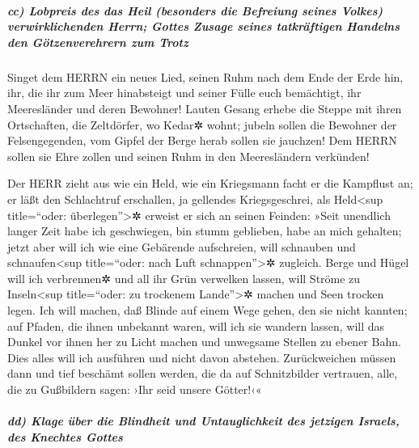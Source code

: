 \hypertarget{cc-lobpreis-des-das-heil-besonders-die-befreiung-seines-volkes-verwirklichenden-herrn-gottes-zusage-seines-tatkruxe4ftigen-handelns-den-guxf6tzenverehrern-zum-trotz}{%
\subparagraph{cc) Lobpreis des das Heil (besonders die Befreiung seines
Volkes) verwirklichenden Herrn; Gottes Zusage seines tatkräftigen
Handelns den Götzenverehrern zum
Trotz}\label{cc-lobpreis-des-das-heil-besonders-die-befreiung-seines-volkes-verwirklichenden-herrn-gottes-zusage-seines-tatkruxe4ftigen-handelns-den-guxf6tzenverehrern-zum-trotz}}

Singet dem HERRN ein neues Lied, seinen Ruhm nach dem
Ende der Erde hin, ihr, die ihr zum Meer hinabsteigt und seiner Fülle
euch bemächtigt, ihr Meeresländer und deren Bewohner!
Lauten Gesang erhebe die Steppe mit ihren Ortschaften,
die Zeltdörfer, wo Kedar✲ wohnt; jubeln sollen die Bewohner der
Felsengegenden, vom Gipfel der Berge herab sollen sie jauchzen!
Dem HERRN sollen sie Ehre zollen und seinen Ruhm in den
Meeresländern verkünden!

Der HERR zieht aus wie ein Held, wie ein Kriegsmann facht
er die Kampflust an; er läßt den Schlachtruf erschallen, ja gellendes
Kriegsgeschrei, als Held\textless sup title=``oder:
überlegen''\textgreater✲ erweist er sich an seinen Feinden:
»Seit unendlich langer Zeit habe ich geschwiegen, bin
stumm geblieben, habe an mich gehalten; jetzt aber will ich wie eine
Gebärende aufschreien, will schnauben und schnaufen\textless sup
title=``oder: nach Luft schnappen''\textgreater✲ zugleich.
Berge und Hügel will ich verbrennen✲ und all ihr Grün
verwelken lassen, will Ströme zu Inseln\textless sup title=``oder: zu
trockenem Lande''\textgreater✲ machen und Seen trocken legen.
Ich will machen, daß Blinde auf einem Wege gehen, den sie
nicht kannten; auf Pfaden, die ihnen unbekannt waren, will ich sie
wandern lassen, will das Dunkel vor ihnen her zu Licht machen und
unwegsame Stellen zu ebener Bahn. Dies alles will ich ausführen und
nicht davon abstehen. Zurückweichen müssen dann und tief
beschämt sollen werden, die da auf Schnitzbilder vertrauen, alle, die zu
Gußbildern sagen: ›Ihr seid unsere Götter!‹«

\hypertarget{dd-klage-uxfcber-die-blindheit-und-untauglichkeit-des-jetzigen-israels-des-knechtes-gottes}{%
\subparagraph{dd) Klage über die Blindheit und Untauglichkeit des
jetzigen Israels, des Knechtes
Gottes}\label{dd-klage-uxfcber-die-blindheit-und-untauglichkeit-des-jetzigen-israels-des-knechtes-gottes}}

